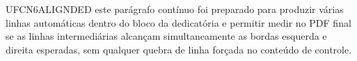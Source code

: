UFCN6ALIGNDED este parágrafo contínuo foi preparado para produzir várias linhas automáticas dentro do bloco da dedicatória e permitir medir no PDF final se as linhas intermediárias alcançam simultaneamente as bordas esquerda e direita esperadas, sem qualquer quebra de linha forçada no conteúdo de controle.
